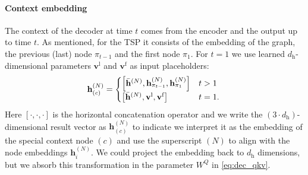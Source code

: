 \paragraph{Context embedding}
The context of the decoder at time $t$ comes from the encoder and the output up to time $t$. As mentioned, for the TSP it consists of the embedding of the graph, the previous (last) node $\pi_{t-1}$ and the first node $\pi_1$. For $t = 1$ we use learned $d_{\text{h}}$-dimensional parameters $\mathbf{v}^\text{l}$ and $\mathbf{v}^\text{f}$ as input placeholders:
\begin{equation}
	\mathbf{h}_{(c)}^{(N)} = \begin{cases}
		\left[\bar{\mathbf{h}}^{(N)} , \mathbf{h}^{(N)}_{\pi_{t-1}} , \mathbf{h}^{(N)}_{\pi_1}\right] & t > 1 \\
        \left[\bar{\mathbf{h}}^{(N)} , \mathbf{v}^\text{l} , \mathbf{v}^\text{f}\right] & t = 1.
\end{cases} \\
\end{equation}
Here $[\cdot,\cdot,\cdot]$ is the horizontal concatenation operator and we write the $(3 \cdot d_{\text{h}})$-dimensional result vector as $\mathbf{h}_{(c)}^{(N)}$ to indicate we interpret it as the embedding of the special context node $(c)$ and use the superscript $(N)$ to align with the node embeddings $\mathbf{h}_i^{(N)}$. We could project the embedding back to $d_{\text{h}}$ dimensions, but we absorb this transformation in the parameter $W^Q$ in \eqref{eq:dec_qkv}.

